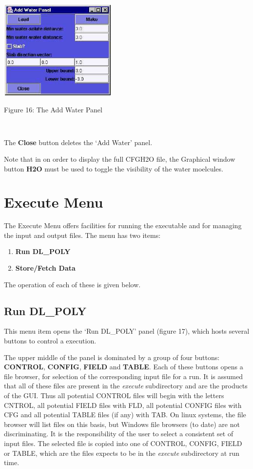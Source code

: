 \begin{enumerate}
~

\vskip 5mm
\centerline{\includegraphics[height=5cm]{addwater.ps}}
\centerline{Figure 16: The Add Water Panel}
\vskip 5mm

~

\noindent

The {\bf Close} button deletes the `Add Water' panel.

Note that in on order to display the full CFGH2O file, 
the Graphical window button {\bf H2O} must be used
to toggle the visibility of the water moelcules.
\end{enumerate}
\section{Execute Menu}
The Execute Menu offers facilities for running the \DD{} executable and
for managing the input and output files. The menu has two items:
\begin{enumerate}
\item {\bf Run DL\_POLY}
\item {\bf Store/Fetch Data}
\end{enumerate}
The operation of each of these is given below.
\subsection{Run DL\_POLY}
This menu item opens the `Run DL\_POLY' panel (figure 17), which hosts
several buttons to control a \DD{} execution.

The upper middle of the panel is dominated by a group of four buttons:
{\bf CONTROL}, {\bf CONFIG}, {\bf FIELD} and {\bf TABLE}. Each of
these buttons opens a file browser, for selection of the corresponding
input file for a \DD{} run. It is assumed that all of these files are
present in the {\em execute} subdirectory and are the products of the
GUI. Thus all potential CONTROL files will begin with the letters
CNTROL, all potential FIELD files with FLD, all potential CONFIG files
with CFG and all potential TABLE files (if any) with TAB. On linux
systems, the file browser will list files on this basis, but Windows
file browsers (to date) are not discriminating. It is the
responsibility of the user to select a consistent set of input
files. The selected file is copied into one of CONTROL, CONFIG, FIELD
or TABLE, which are the files \DD{} expects to be in the {\em execute}
subdirectory at run time.

